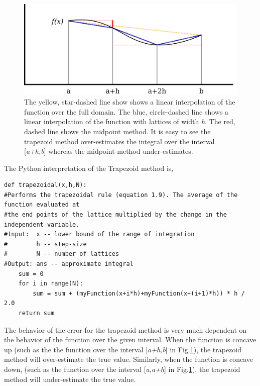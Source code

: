 \documentclass[10pt]{article}
\begin{document}
\begin{figure}[!h]
    \begin{center}
	\includegraphics[width=\columnwidth]{interpolation.png}
	\caption{The yellow, star-dashed line show shows a linear interpolation of the function over the full domain. The blue, circle-dashed line shows a linear interpolation of the function with lattices of width \textit{h}. The red, dashed line shows the midpoint method. It is easy to see the trapezoid method over-estimates the integral over the interval [\textit{a+h,b}] whereas the midpoint method under-estimates.}
	\label{fig:interpolation}
	\end{center}
\end{figure}
    
The Python interpretation of the Trapezoid method is,
\begin{lstlisting}
def trapezoidal(x,h,N):
#Performs the trapezoidal rule (equation 1.9). The average of the function evaluated at
#the end points of the lattice multiplied by the change in the independent variable.
#Input:  x -- lower bound of the range of integration
#        h -- step-size
#        N -- number of lattices
#Output: ans -- approximate integral    
    sum = 0
    for i in range(N):
        sum = sum + (myFunction(x+i*h)+myFunction(x+(i+1)*h)) * h / 2.0
    return sum 
\end{lstlisting}

The behavior of the error for the trapezoid method is very much dependent on the behavior of the function over the given interval. When the function is concave up (such as the the function over the interval [\textit{a+h,b}] in Fig.\ref{fig:interpolation}), the trapezoid method will over-estimate the true value. Similarly, when the function is concave down, (such as the function over the interval [\textit{a,a+h}] in Fig.\ref{fig:interpolation}), the trapezoid method will under-estimate the true value. 
\end{document}
